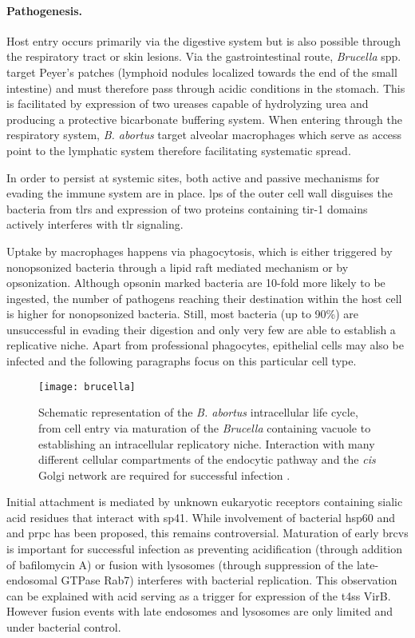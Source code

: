 \paragraph{Pathogenesis.}
Host entry occurs primarily via the digestive system but is also possible through the respiratory tract or skin lesions. Via the gastrointestinal route, \textit{Brucella} spp. target Peyer's patches (lymphoid nodules localized towards the end of the small intestine) and must therefore pass through acidic conditions in the stomach. This is facilitated by expression of two ureases capable of hydrolyzing urea and producing a protective bicarbonate buffering system. When entering through the respiratory system, \textit{B. abortus} target alveolar macrophages which serve as access point to the lymphatic system therefore facilitating systematic spread.

In order to persist at systemic sites, both active and passive mechanisms for evading the immune system are in place. \Gls{lps} of the outer cell wall disguises the bacteria from \glspl{tlr} and expression of two proteins containing \gls{tir-1} domains actively interferes with \gls{tlr} signaling.

Uptake by macrophages happens via phagocytosis, which is either triggered by nonopsonized bacteria through a lipid raft mediated mechanism or by opsonization. Although opsonin marked bacteria are 10-fold more likely to be ingested, the number of pathogens reaching their destination within the host cell is higher for nonopsonized bacteria. Still, most bacteria (up to 90\%) are unsuccessful in evading their digestion and only very few are able to establish a replicative niche. Apart from professional phagocytes, epithelial cells may also be infected and the following paragraphs focus on this particular cell type.

\begin{figure}
  \centering
  \texttt{[image: brucella]}
  \caption[Schematic representation of the \textit{B. abortus} intracellular life cycle.]{Schematic representation of the \textit{B. abortus} intracellular life cycle, from cell entry via maturation of the \textit{Brucella} containing vacuole to establishing an intracellular replicatory niche. Interaction with many different cellular compartments of the endocytic pathway and the \textit{cis} Golgi network are required for successful infection \citep{VonBargen2012}.}
  \label{fig:brucella}
\end{figure}

Initial attachment is mediated by unknown eukaryotic receptors containing sialic acid residues that interact with \gls{sp41}. While involvement of bacterial \acrshort{hsp}60 and and \gls{prpc} has been proposed, this remains controversial. Maturation of early \glspl{brcv} is important for successful infection as preventing acidification (through addition of bafilomycin A) or fusion with lysosomes (through suppression of the late-endosomal GTPase Rab7) interferes with bacterial replication. This observation can be explained with acid serving as a trigger for expression of the \gls{t4ss} VirB. However fusion events with late endosomes and lysosomes are only limited and under bacterial control.

